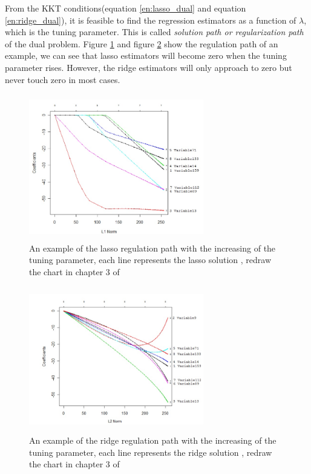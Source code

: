 From the KKT conditions(equation \ref{en:lasso_dual} and equation \ref{en:ridge_dual}), it is feasible to find the regression estimators as a function of $\lambda$, which is the tuning parameter. This is called \textit{solution path or regularization path} of the dual problem. Figure \ref{fig:lasso_path} and figure \ref{fig:ridge_path} show the regulation path of an example, we can see that lasso estimators will become zero when the tuning parameter rises. However, the ridge estimators will only approach to zero but never touch zero in most cases. 


\begin{figure}[hbtp]
	\begin{center}
		\includegraphics[width=3in,height=2.5in]{figures/lasso_p.jpg}
	\end{center}
	\caption{An example of the lasso regulation path with the increasing of the tuning parameter, each line represents the lasso solution , redraw the chart in chapter 3 of\cite{friedman2001elements}} \label{fig:lasso_path}
\end{figure}

\begin{figure}[hbtp]
	\begin{center}
		\includegraphics[width=3in,height=2.5in]{figures/ridge_p.jpg}
	\end{center}
	\caption{An example of the ridge regulation path with the increasing of the tuning parameter, each line represents the ridge solution , redraw the chart in chapter 3 of\cite{friedman2001elements}} \label{fig:ridge_path}
\end{figure}

